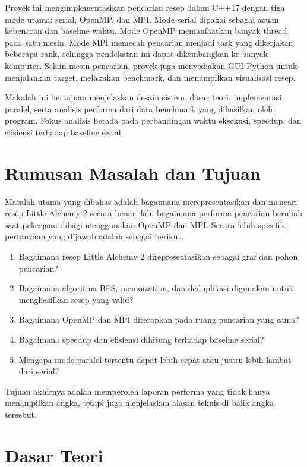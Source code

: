 \documentclass[conference]{IEEEtran}
\begin{document}
Proyek ini mengimplementasikan pencarian resep dalam C++17 dengan tiga mode utama: serial, OpenMP, dan MPI. Mode serial dipakai sebagai acuan kebenaran dan baseline waktu. Mode OpenMP memanfaatkan banyak thread pada satu mesin. Mode MPI memecah pencarian menjadi task yang dikerjakan beberapa rank, sehingga pendekatan ini dapat dikembangkan ke banyak komputer. Selain mesin pencarian, proyek juga menyediakan GUI Python untuk menjalankan target, melakukan benchmark, dan menampilkan visualisasi resep.

Makalah ini bertujuan menjelaskan desain sistem, dasar teori, implementasi paralel, serta analisis performa dari data benchmark yang dihasilkan oleh program. Fokus analisis berada pada perbandingan waktu eksekusi, speedup, dan efisiensi terhadap baseline serial.

\section{Rumusan Masalah dan Tujuan}

Masalah utama yang dibahas adalah bagaimana merepresentasikan dan mencari resep Little Alchemy 2 secara benar, lalu bagaimana performa pencarian berubah saat pekerjaan dibagi menggunakan OpenMP dan MPI. Secara lebih spesifik, pertanyaan yang dijawab adalah sebagai berikut.

\begin{enumerate}
  \item Bagaimana resep Little Alchemy 2 direpresentasikan sebagai graf dan pohon pencarian?
  \item Bagaimana algoritma BFS, memoization, dan deduplikasi digunakan untuk menghasilkan resep yang valid?
  \item Bagaimana OpenMP dan MPI diterapkan pada ruang pencarian yang sama?
  \item Bagaimana speedup dan efisiensi dihitung terhadap baseline serial?
  \item Mengapa mode paralel tertentu dapat lebih cepat atau justru lebih lambat dari serial?
\end{enumerate}

Tujuan akhirnya adalah memperoleh laporan performa yang tidak hanya menampilkan angka, tetapi juga menjelaskan alasan teknis di balik angka tersebut.

\section{Dasar Teori}
\end{document}
